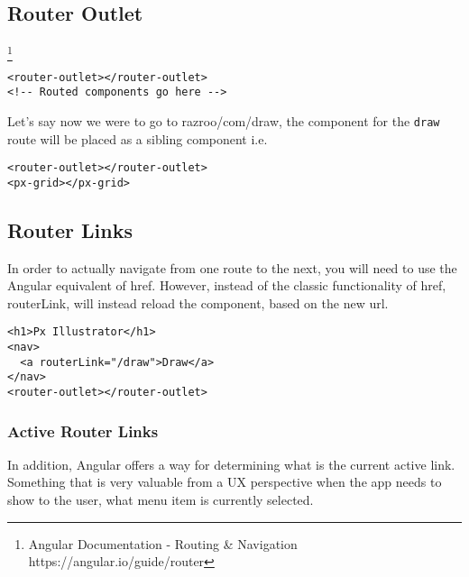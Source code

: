 
\subsection{ Router Outlet }
\begin{displayquote}
\footnote{Angular Documentation - Routing \& Navigation https://angular.io/guide/router}
\end{displayquote}

\begin{verbatim}
<router-outlet></router-outlet>
<!-- Routed components go here -->
\end{verbatim}

Let's say now we were to go to razroo/com/draw, the component for the 
\lstinline{draw} route will be placed as a sibling component i.e. 
\begin{lstlisting}
<router-outlet></router-outlet>
<px-grid></px-grid>  
\end{lstlisting}

\subsection{ Router Links }
In order to actually navigate from one route to the next, you will 
need to use the Angular equivalent of href. However, instead of 
the classic functionality of href, routerLink, will instead 
reload the component, based on the new url. 
\begin{lstlisting}
<h1>Px Illustrator</h1>
<nav>
  <a routerLink="/draw">Draw</a>
</nav>
<router-outlet></router-outlet>
\end{lstlisting}

\subsubsection{Active Router Links}
In addition, Angular offers a way for determining what is the current 
active link. Something that is very valuable from a UX perspective 
when the app needs to show to the user, what menu item is 
currently selected. 


